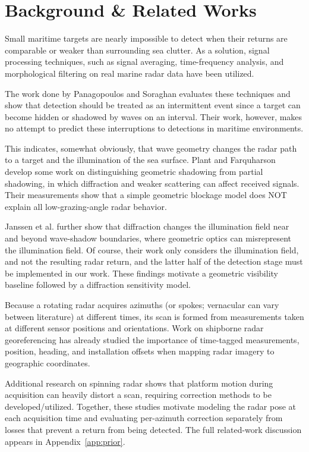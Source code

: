 \documentclass[10pt,letterpaper]{article}
\begin{document}
\section{Background \& Related Works}

Small maritime targets are nearly impossible to detect when their returns are comparable or weaker than surrounding sea clutter. As a solution, signal processing techniques, such as signal averaging, time-frequency analysis, and morphological filtering on real marine radar data have been utilized.

The work done by Panagopoulos and Soraghan evaluates these techniques and show that detection should be treated as an intermittent event since a target can become hidden or shadowed by waves on an interval. \cite{Panagopoulos2004SmallTarget} Their work, however, makes no attempt to predict these interruptions to detections in maritime environments.

This indicates, somewhat obviously, that wave geometry changes the radar path to a target and the illumination of the sea surface.
Plant and Farquharson develop some work on distinguishing geometric shadowing from partial shadowing, in which diffraction and weaker scattering can affect received signals. \cite{Plant2012WaveShadowing}
Their measurements show that a simple geometric blockage model does NOT explain all low-grazing-angle radar behavior.

Janssen et al. further show that diffraction changes the illumination field near and beyond wave-shadow boundaries, where geometric optics can misrepresent the illumination field. Of course, their work only considers the illumination field, and not the resulting radar return, and the latter half of the detection stage must be implemented in our work.
These findings motivate a geometric visibility baseline followed by a diffraction sensitivity model. \cite{Janssen2026Diffraction}

Because a rotating radar acquires azimuths (or spokes; vernacular can vary between literature) at different times, its scan is formed from measurements taken at different sensor positions and orientations. Work on shipborne radar georeferencing has already studied the importance of time-tagged measurements, position, heading, and installation offsets when mapping radar imagery to geographic coordinates. \cite{Lund2018SeaIceDrift}

Additional research on spinning radar shows that platform motion during acquisition can heavily distort a scan, requiring correction methods to be developed/utilized. Together, these studies motivate modeling the radar pose at each acquisition time and evaluating per-azimuth correction separately from losses that prevent a return from being detected. \cite{Burnett2021MotionDistortion} The full related-work discussion appears in Appendix~\ref{app:prior}.
\end{document}
